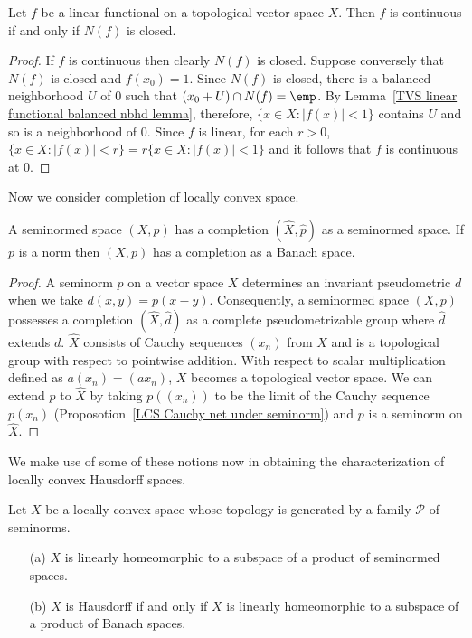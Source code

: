 \begin{proposition}\label{TVS linear functional continuous iff kernel closed}
Let $f$ be a linear functional on a topological vector space $X$. Then $f$ is continuous if and only if $N(f)$ is closed.
\end{proposition}
\begin{proof}
If $f$ is continuous then clearly $N(f)$ is closed. Suppose conversely that $N(f)$ is closed and $f(x_0)=1$. Since $N(f)$ is closed, there is a balanced neighborhood $U$ of $0$ such that $(x_0+U)\cap N(f)=\emp$. By Lemma~\ref{TVS linear functional balanced nbhd lemma}, therefore, $\{x\in X:|f(x)|<1\}$ contains $U$ and so is a neighborhood of $0$. Since $f$ is linear, for each $r>0$, $\{x\in X:|f(x)|<r\}=r\{x\in X:|f(x)|<1\}$ and it follows that $f$ is continuous at $0$.
\end{proof}
Now we consider completion of locally convex space.
\begin{proposition}\label{seminormed space completion}
A seminormed space $(X,p)$ has a completion $(\widehat{X},\hat{p})$ as a seminormed space. If $p$ is a norm then $(X,p)$ has a completion as a Banach space.
\end{proposition}
\begin{proof}
A seminorm $p$ on a vector space $X$ determines an invariant pseudometric $d$ when we take $d(x,y)=p(x-y)$. Consequently, a seminormed space $(X,p)$ possesses a completion $(\widehat{X},\hat{d})$ as a complete pseudometrizable group where $\hat{d}$ extends $d$. $\widehat{X}$ consists of Cauchy sequences $(x_n)$ from $X$ and is a topological group with respect to pointwise addition. With respect to scalar multiplication defined as $a(x_n)=(ax_n)$, $X$ becomes a topological vector space. We can extend $p$ to $\widehat{X}$ by taking $p((x_n))$ to be the limit of the Cauchy sequence $p(x_n)$ (Proposotion~\ref{LCS Cauchy net under seminorm}) and $p$ is a seminorm on $\widehat{X}$.
\end{proof}
We make use of some of these notions now in obtaining the characterization
of locally convex Hausdorff spaces.
\begin{proposition}\label{LCS subspace of product}
Let $X$ be a locally convex space whose topology is generated by a family $\mathscr{P}$ of seminorms.
\begin{itemize}
\item[(a)] $X$ is linearly homeomorphic to a subspace of a product of seminormed spaces.
\item[(b)] $X$ is Hausdorff if and only if $X$ is linearly homeomorphic to a subspace of a product of Banach spaces.
\end{itemize}
\end{proposition}
